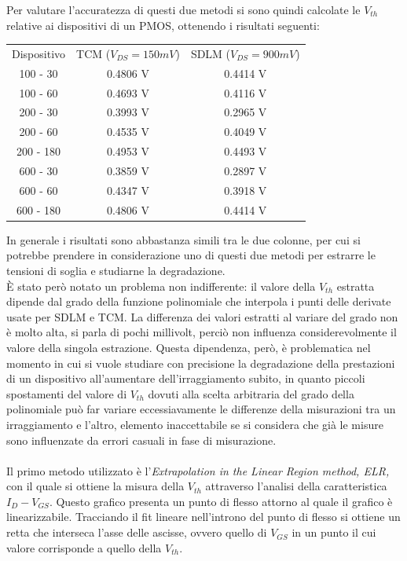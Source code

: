 \documentclass[12pt, letterpaper]{book}
\begin{document}
Per valutare l'accuratezza di questi due metodi si sono quindi calcolate le $V_{th}$ relative ai dispositivi di un PMOS, ottenendo i risultati seguenti:

\begin{center}
\begin{tabular}{c c c}
Dispositivo & TCM ($V_{DS} = 150 mV$) & SDLM ($V_{DS} = 900 mV$) \\
100 - 30  & 0.4806 V & 0.4414 V \\
100 - 60  & 0.4693 V & 0.4116 V \\
200 - 30  & 0.3993 V & 0.2965 V \\
200 - 60  & 0.4535 V & 0.4049 V \\
200 - 180 & 0.4953 V & 0.4493 V \\
600 - 30 & 0.3859 V & 0.2897 V \\
600 - 60 & 0.4347 V & 0.3918 V \\
600 - 180 & 0.4806 V & 0.4414 V \\

\end{tabular}
\end{center}

In generale i risultati sono abbastanza simili tra le due colonne, per cui si potrebbe prendere in considerazione uno di questi due metodi  per estrarre le tensioni di soglia e studiarne la degradazione.\\
È stato però notato un problema non indifferente: il valore della $V_{th}$ estratta dipende dal grado della funzione polinomiale che interpola i punti delle derivate usate per SDLM e TCM. La differenza dei valori estratti al variare del grado non è molto alta, si parla di pochi millivolt, perciò non influenza considerevolmente il valore della singola estrazione. Questa dipendenza, però, è problematica nel momento in cui si vuole studiare con precisione la degradazione della prestazioni di un dispositivo all'aumentare dell'irraggiamento subito, in quanto piccoli spostamenti del valore di $V_{th}$ dovuti alla scelta arbitraria del grado della polinomiale può far variare eccessiavamente le differenze della misurazioni tra un irraggiamento e l'altro, elemento inaccettabile se si considera che già le misure sono influenzate da errori casuali in fase di misurazione.\\\\





Il primo metodo utilizzato è l'\emph{Extrapolation in the Linear Region method, ELR,} con il quale si ottiene la misura della $V_{th}$ attraverso l'analisi della caratteristica $I_D-V_{GS}$. Questo grafico presenta un punto di flesso attorno al quale il grafico è linearizzabile. Tracciando il fit lineare nell'introno del punto di flesso si ottiene un retta che interseca l'asse delle ascisse, ovvero quello di $V_{GS}$ in un punto il cui valore corrisponde a quello della $V_{th}$.\\
\end{document}
